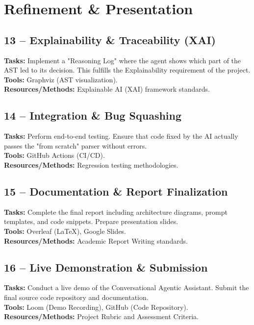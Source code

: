 \documentclass[a4paper,11pt]{article}
\newcommand{\weekdetail}[3]{
    \textbf{Tasks:} #1 \\
    \textbf{Tools:} #2 \\
    \textbf{Resources/Methods:} #3 \\
}
\begin{document}
\section{Refinement \& Presentation}

\subsection{13 -- Explainability \& Traceability (XAI)}
\weekdetail{
    Implement a "Reasoning Log" where the agent shows which part of the AST led to its decision. This fulfills the Explainability requirement of the project.
}{
    Graphviz (AST visualization).
}{
    Explainable AI (XAI) framework standards.
}

\subsection{14 -- Integration & Bug Squashing}
\weekdetail{
    Perform end-to-end testing. Ensure that code fixed by the AI actually passes the "from scratch" parser without errors.
}{
    GitHub Actions (CI/CD).
}{
    Regression testing methodologies.
}

\subsection{15 -- Documentation \& Report Finalization}
\weekdetail{
    Complete the final report including architecture diagrams, prompt templates, and code snippets. Prepare presentation slides.
}{
    Overleaf (LaTeX), Google Slides.
}{
    Academic Report Writing standards.
}

\subsection{16 -- Live Demonstration \& Submission}
\weekdetail{
    Conduct a live demo of the Conversational Agentic Assistant. Submit the final source code repository and documentation.
}{
    Loom (Demo Recording), GitHub (Code Repository).
}{
    Project Rubric and Assessment Criteria.
}
\end{document}
